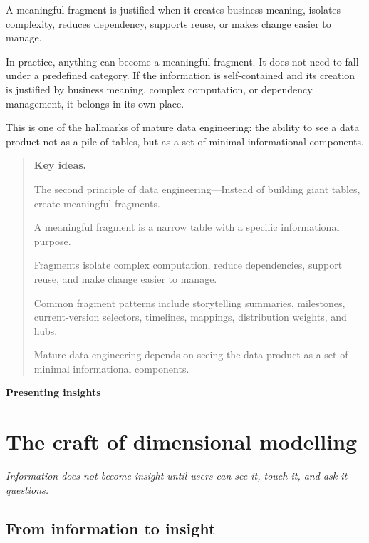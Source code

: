 \documentclass[10pt,openany,10pt]{book}
\begin{document}
A meaningful fragment is justified when it creates business meaning,
isolates complexity, reduces dependency, supports reuse, or makes change
easier to manage.

In practice, anything can become a meaningful fragment. It does not need
to fall under a predefined category. If the information is
self-contained and its creation is justified by business meaning,
complex computation, or dependency management, it belongs in its own
place.

This is one of the hallmarks of mature data engineering: the ability to
see a data product not as a pile of tables, but as a set of minimal
informational components.

\begin{quote}
\textbf{Key ideas.}

The second principle of data engineering---Instead of building giant
tables, create meaningful fragments.

A meaningful fragment is a narrow table with a specific informational
purpose.

Fragments isolate complex computation, reduce dependencies, support
reuse, and make change easier to manage.

Common fragment patterns include storytelling summaries, milestones,
current-version selectors, timelines, mappings, distribution weights,
and hubs.

Mature data engineering depends on seeing the data product as a set of
minimal informational components.
\end{quote}

\newpage

\thispagestyle{empty}
\hypertarget{docs-presenting-insights}{}
\vspace*{0.34\textheight}
\begin{center}
{\Huge\bfseries Presenting insights}
\end{center}
\newpage

\chapter{The craft of dimensional
modelling}\label{docs-presenting-insights-the-craft-of-dimensional-modelling}

\emph{Information does not become insight until users can see it, touch
it, and ask it questions.}

\section{From information to insight}\label{from-information-to-insight}
\end{document}
